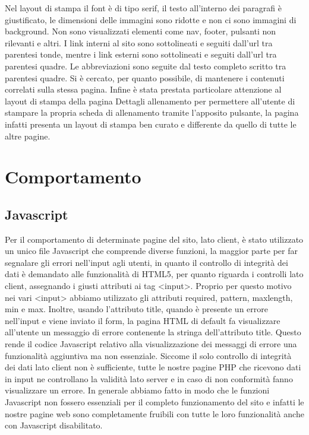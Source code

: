 \documentclass[a4paper]{article}
\begin{document}
	Nel layout di stampa il font è di tipo serif, il testo all'interno dei paragrafi è giustificato, le dimensioni delle immagini sono ridotte e non ci sono immagini di background. Non sono visualizzati elementi come nav, footer, pulsanti non rilevanti e altri. I link interni al sito sono sottolineati e seguiti dall'url tra parentesi tonde, mentre i link esterni sono sottolineati e seguiti dall'url tra parentesi quadre. Le abbreviazioni sono seguite dal testo completo scritto tra parentesi quadre. Si è cercato, per quanto possibile, di mantenere i contenuti correlati sulla stessa pagina. Infine è stata prestata particolare attenzione al layout di stampa della pagina Dettagli allenamento per permettere all'utente di stampare la propria scheda di allenamento tramite l'apposito pulsante, la pagina infatti presenta un layout di stampa ben curato e differente da quello di tutte le altre pagine.

	\section{Comportamento}
	\subsection{Javascript}
	Per il comportamento di determinate pagine del sito, lato client, è stato utilizzato un unico file Javascript che comprende diverse funzioni, la maggior parte per far segnalare gli errori nell'input agli utenti, in quanto il controllo di integrità dei dati è demandato alle funzionalità di HTML5, per quanto riguarda i controlli lato client, assegnando i giusti attributi ai tag <input>. Proprio per questo motivo nei vari <input> abbiamo utilizzato gli attributi required, pattern, maxlength, min e max. Inoltre, usando l'attributo title, quando è presente un errore nell'input e viene inviato il form, la pagina HTML di default fa visualizzare all'utente un messaggio di errore contenente la stringa dell'attributo title. Questo rende il codice Javascript relativo alla visualizzazione dei messaggi di errore una funzionalità aggiuntiva ma non essenziale. Siccome il solo controllo di integrità dei dati lato client non è sufficiente, tutte le nostre pagine PHP che ricevono dati in input ne controllano la validità lato server e in caso di non conformità fanno visualizzare un errore.  In generale abbiamo fatto in modo che le funzioni Javascript non fossero essenziali per il completo funzionamento del sito e  infatti le nostre pagine web sono completamente fruibili con tutte le loro funzionalità anche con Javascript disabilitato.
\end{document}
